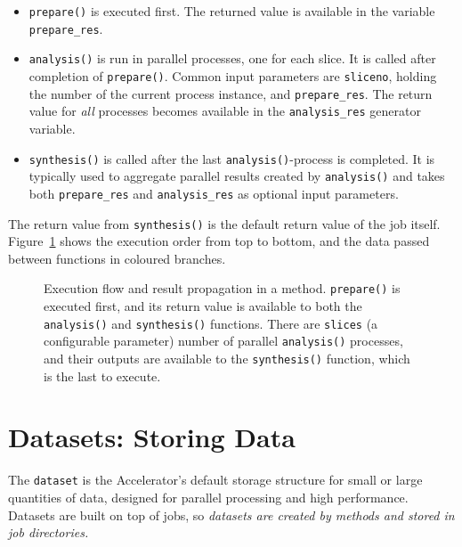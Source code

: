 \begin{itemize}
\item[] \texttt{prepare()} is executed first.  The returned value is
  available in the variable \texttt{prepare\_res}.
\item[] \texttt{analysis()} is run in parallel processes, one for each
  slice.  It is called after completion of \texttt{prepare()}.  Common
  input parameters are \texttt{sliceno}, holding the number of the
  current process instance, and \texttt{prepare\_res}.  The return
  value for \emph{all} processes becomes available in the
  \texttt{analysis\_res} generator variable.
\item[] \texttt{synthesis()} is called after the last
  \texttt{analysis()}-process is completed.  It is typically used to
  aggregate parallel results created by \texttt{analysis()} and takes
  both \texttt{prepare\_res} and \texttt{analysis\_res} as optional
  input parameters.
\end{itemize}
The return value from \texttt{synthesis()} is the default return value
of the job itself.  Figure~\ref{fig:prepanasyn} shows the execution
order from top to bottom, and the data passed between functions in
coloured branches.

\begin{figure}[b]
  \begin{center}
    
    \caption{Execution flow and result propagation in a method.
      \texttt{prepare()} is executed first, and its return value is
      available to both the \texttt{analysis()} and
      \texttt{synthesis()} functions.  There are \texttt{slices} (a
      configurable parameter) number of parallel \texttt{analysis()}
      processes, and their outputs are available to the
      \texttt{synthesis()} function, which is the last to execute.}
    \label{fig:prepanasyn}
  \end{center}
\end{figure}





\section{Datasets: Storing Data}

The \texttt{dataset} is the Accelerator's default storage structure
for small or large quantities of data, designed for parallel
processing and high performance.  Datasets are built on top of jobs,
so \emph{datasets are created by methods and stored in job
directories.}

